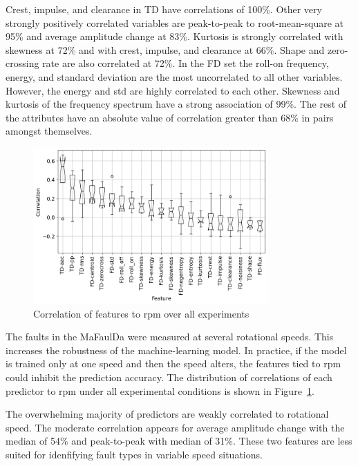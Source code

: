 Crest, impulse, and clearance in TD have correlations of 100\%. Other very strongly positively correlated variables are peak-to-peak to root-mean-square at 95\% and average amplitude change at 83\%. Kurtosis is strongly correlated with skewness at 72\% and with crest, impulse, and clearance at 66\%. Shape and zero-crossing rate are also correlated at 72\%. In the FD set the roll-on frequency, energy, and standard deviation are the most uncorrelated to all other variables. However, the energy and std are highly correlated to each other. Skewness and kurtosis of the frequency spectrum have a strong association of 99\%. The rest of the attributes have an absolute value of correlation greater than 68\% in pairs amongst themselves.

\begin{figure}[h]
    \centering
    \includegraphics[width=0.8\textwidth]{assets/results/feature-values/corr-to-rpm.png}
    \caption{Correlation of features to rpm over all experiments}
    \label{fig:design:rpm-corr}
\end{figure}

The faults in the MaFaulDa were measured at several rotational speeds. This increases the robustness of the machine-learning model. In practice, if the model is trained only at one speed and then the speed alters, the features tied to rpm could inhibit the prediction accuracy. The distribution of correlations of each predictor to rpm under all experimental conditions is shown in Figure~\ref{fig:design:rpm-corr}. 

The overwhelming majority of predictors are weakly correlated to rotational speed. The moderate correlation appears for average amplitude change with the median of 54\% and peak-to-peak with median of 31\%. These two features are less suited for idenfifying fault types in variable speed situations.


